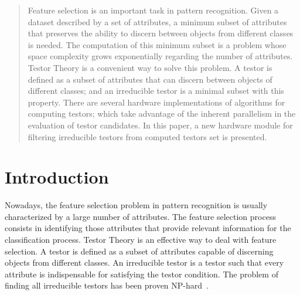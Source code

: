 \documentclass[conference]{IEEEtran}
\begin{document}




\maketitle


\begin{abstract}
	Feature selection is an important task in pattern recognition. Given a dataset described by a set of attributes, a minimum subset of attributes that preserves the ability to discern between objects from different classes is needed. The computation of this minimum subset is a problem whose space complexity grows
exponentially regarding the number of attributes. Testor Theory is a convenient way to solve this problem. A testor is defined as a subset of attributes that can discern between objects of different classes; and an irreducible testor is a minimal subset with this property. There are several hardware implementations of algorithms for computing testors; which take advantage of the inherent parallelism in the evaluation of testor candidates. In this paper, a new hardware module for filtering irreducible testors from computed testors set is presented.
\end{abstract}





%
\IEEEpeerreviewmaketitle



\section{Introduction}
Nowadays, the feature selection problem in pattern recognition is usually characterized by a large number of 
attributes. The feature selection process consists in identifying those attributes that provide relevant 
information for the classification process. 
Testor Theory is an effective way to deal with feature selection.
 A testor is defined as a subset of attributes capable of discerning objects from 
different classes. An irreducible testor is a testor such that every attribute is indispensable for satisfying 
the testor condition. The problem of finding all irreducible testors has been proven NP-hard~\cite{Skowron92}.
\end{document}
